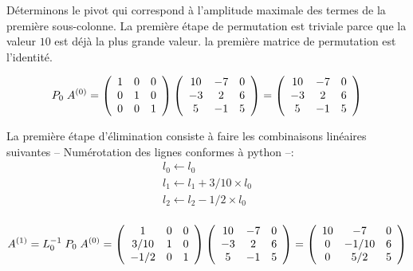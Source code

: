 \documentclass[a4paper, 10pt]{article}
\begin{document}
Déterminons le pivot qui correspond à l'amplitude maximale des termes
 de la première sous-colonne. La première étape de permutation est triviale 
 parce que la valeur $10$ est déjà la plus grande valeur. la première
 matrice de permutation est l'identité. 
 
\begin{equation}
 P_0\; A^{(0)}=
 \left(
\begin{array}{c c c}
1  & 0   &  0  \\
0  &  1   & 0  \\
0  &  0  &  1  
\end{array}
\right)
 \left(
\begin{array}{c c c}
10  & -7   &  0  \\
-3  &  2   & 6   \\
 5  &  -1  &  5  
\end{array}
\right)
=
 \left(
\begin{array}{c c c}
10  & -7   &  0  \\
-3  &  2   & 6   \\
 5  &  -1  &  5  
\end{array}
\right)
\end{equation}

La première étape d'élimination consiste à faire les combinaisons linéaires suivantes
-- Numérotation des lignes conformes à python --: 
 \begin{equation}
 \begin{array}{c}
 l_0 \leftarrow l_0 \\
   l_1 \leftarrow l_1 +3/10 \times l_0   \\ l_2 \leftarrow l_2 -1/2 \times l_0  \\ 
\end{array}
\end{equation}

\begin{equation}
 A^{(1)}=L^{-1}_0 \;  P_0 \; A^{(0)}=
  \left(
\begin{array}{c c c}
1  & 0   &  0  \\
3/10  &  1   & 0  \\
-1/2  &  0  &  1  
\end{array}
\right)
 \left(
\begin{array}{c c c}
10  & -7   &  0  \\
-3  &  2   & 6   \\
 5  &  -1  &  5  
\end{array}
\right)
=
 \left(
\begin{array}{c c c}
10  & -7   &  0  \\
0  &  -1/10   & 6   \\
0  &  5/2  &  5  
\end{array}
\right)
\end{equation}
\end{document}
